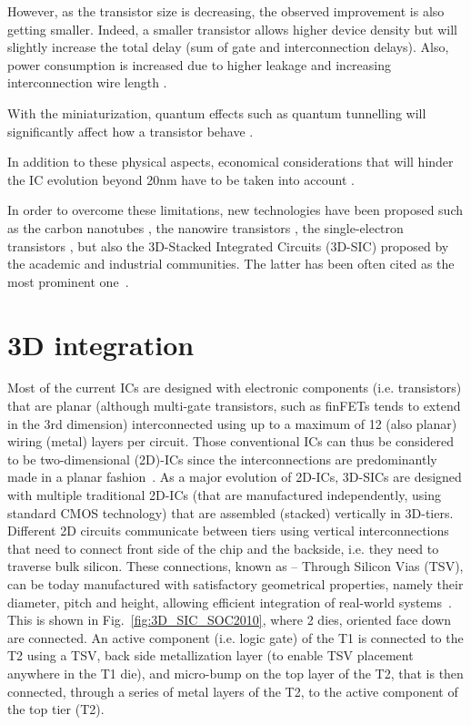 However, as the transistor size is decreasing, the observed improvement is also getting smaller. Indeed, a smaller transistor allows higher device density but will slightly increase the total delay (sum of gate and interconnection delays). Also, power consumption is increased due to higher leakage and increasing interconnection wire length \cite{5227192}.

With the miniaturization, quantum effects such as quantum tunnelling will significantly affect how a transistor behave \cite{1240081}.

In addition to these physical aspects, economical considerations that will hinder the IC evolution beyond 20nm have to be taken into account \cite{5227192,PFF10}.

In order to overcome these limitations, new technologies have been proposed such as the carbon nanotubes \cite{tans1998room}, the nanowire transistors \cite{doi:10.1021/nl025875l}, the single-electron transistors \cite{citeulike:4194929}, but also the 3D-Stacked Integrated Circuits (3D-SIC) proposed by the academic and industrial communities. The latter has been often cited as the most prominent one~\cite{659500}.

\section{3D integration}

Most of the current ICs are designed with electronic components (i.e. transistors) that are planar (although multi-gate transistors, such as finFETs tends to extend in the 3rd dimension) interconnected using up to a maximum of 12 (also planar) wiring (metal) layers per circuit. Those conventional ICs can thus be considered to be two-dimensional (2D)-ICs since the interconnections are predominantly made in a planar fashion~\cite{1393404,fujitsu08}. As a major evolution of 2D-ICs, 3D-SICs are designed with multiple traditional 2D-ICs (that are manufactured independently, using standard CMOS technology) that are assembled (stacked) vertically in 3D-tiers. Different 2D circuits communicate between tiers using vertical interconnections that need to connect front side of the chip and the backside, i.e. they need to traverse bulk silicon. These connections, known as \--- Through Silicon Vias (TSV), can be today manufactured with satisfactory geometrical properties, namely their diameter, pitch and height, allowing efficient integration of real-world systems~\cite{1705326,5746413}. This is shown in Fig.~\ref{fig:3D_SIC_SOC2010}, where 2 dies, oriented face down are connected. An active component (i.e. logic gate) of the T1 is connected to the T2 using a TSV, back side metallization layer (to enable TSV placement anywhere in the T1 die), and micro-bump on the top layer of the T2, that is then connected, through a series of metal layers of the T2, to the active component of the top tier (T2).

